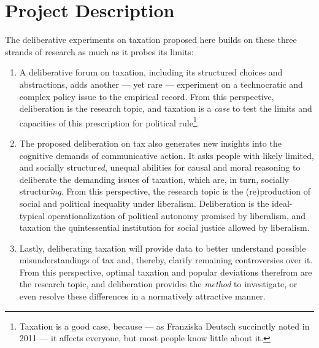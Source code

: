 \section{Project Description}




The deliberative experiments on taxation proposed here builds on these three strands of research as much as it probes its limits:

\begin{enumerate}
\item 
	A deliberative forum on taxation, including its structured choices and abstractions, adds another --- yet rare --- experiment on a technocratic and complex policy issue to the empirical record.
	From this perspective, deliberation is the research topic, and taxation is a \emph{case} to test the limits and capacities of this prescription for political {rule}\footnote{
		Taxation is a good case, because --- as Franziska Deutsch succinctly noted in 2011 --- it affects everyone, but most people know little about it.}.
	
\item The proposed deliberation on tax also generates new insights into the cognitive demands of communicative action.
	It asks people with likely limited, and socially structur\emph{ed}, unequal abilities for causal and moral reasoning to deliberate the demanding issues of taxation, which are, in turn, socially structur\emph{ing}.
	From this perspective, the research topic is the (re)production of social and political inequality under liberalism.
	Deliberation is the ideal-typical operationalization of political autonomy promised by liberalism, and taxation the quintessential institution for social justice allowed by liberalism. %
	
\item Lastly, deliberating taxation will provide data to better understand possible misunderstandings of tax and, thereby, clarify remaining controversies over it.
	From this perspective, optimal taxation and popular deviations therefrom are the research topic, and deliberation provides the \emph{method} to investigate, or even resolve these differences in a normatively attractive \citep{Rawls-1971-aa,Habermas-1984-aa} manner.
\end{enumerate}

